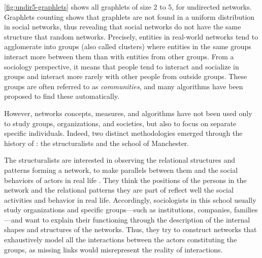 \autoref{fig:undir5-graphlets} shows all graphlets of size 2 to 5, for undirected networks.
Graphlets counting shows that graphlets are not found in a uniform distribution in social networks\cite{charbeyStarsHolesPaths2019}, thus revealing that social networks do not have the same structure that random networks.
Precisely, entities in real-world networks tend to agglomerate into groups (also called clusters) where entities in the same groups interact more between them than with entities from other groups\cite{girvanCommunityStructureSocial2002}.
From a sociology perspective, it means that people tend to interact and socialize in groups and interact more rarely with other people from outside groups.
These groups are often referred to as \emph{communities}, and many algorithms have been proposed to find these automatically\cite{fortunatoCommunityDetectionGraphs2010}.

However, networks concepts, measures, and algorithms have not been used only to study groups, organizations, and societies, but also to focus on separate specific individuals.
Indeed, two distinct methodologies emerged through the history of \sna: the structuralists and the school of Manchester\cite{eveDeuxTraditionsAnalyse2002, maurizio2000, freemanDevelopmentSocialNetwork2004}.

The structuralists are interested in observing the relational structures and patterns forming a network, to make parallels between them and the social behaviors of actors in real life \cite{lazegaReseaux}.
They think the positions of the persons in the network and the relational patterns they are part of reflect well the social activities and behavior in real life.
Accordingly, sociologists in this school usually study organizations and specific groups---such as institutions, companies, families---and want to explain their functioning through the description of the internal shapes and structures of the networks.
Thus, they try to construct networks that exhaustively model all the interactions between the actors constituting the groups, as missing links would misrepresent the reality of interactions.


